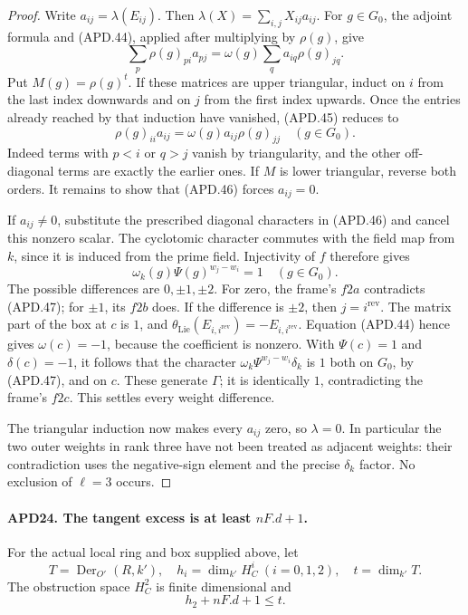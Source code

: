 \documentclass[11pt,a4paper]{article}
\numberwithin{equation}{section}
\theoremstyle{remark}\newtheorem{remark}[theorem]{Remark}
\begin{document}
\begin{proof}
Write \(a_{ij}=\lambda(E_{ij})\).  Then
\(\lambda(X)=\sum_{i,j}X_{ij}a_{ij}\).  For \(g\in G_0\),
the adjoint formula and (APD.44), applied after multiplying by
\(\rho(g)\), give
\[
 \sum_p\rho(g)_{pi}a_{pj}
                  =\omega(g)\sum_q a_{iq}\rho(g)_{jq}.
                                                               \tag{APD.45}
\]
Put \(M(g)=\rho(g)^t\).  If these matrices are upper
triangular, induct on \(i\) from the last index downwards
and on \(j\) from the first index upwards.  Once the entries
already reached by that induction have vanished, (APD.45)
reduces to
\[
       \rho(g)_{ii}a_{ij}
                         =\omega(g)a_{ij}\rho(g)_{jj}
                                  \quad(g\in G_0).       \tag{APD.46}
\]
Indeed terms with \(p<i\) or \(q>j\) vanish by triangularity,
and the other off-diagonal terms are exactly the earlier ones.
If \(M\) is lower triangular, reverse both orders.  It remains
to show that (APD.46) forces \(a_{ij}=0\).

If \(a_{ij}\ne0\), substitute the prescribed diagonal
characters in (APD.46) and cancel this nonzero scalar.  The
cyclotomic character commutes with the field map from \(k\),
since it is induced from the prime field.  Injectivity of \(f\)
therefore gives
\[
          \omega_k(g)\Psi(g)^{w_j-w_i}=1
                                  \quad(g\in G_0).       \tag{APD.47}
\]
The possible differences are \(0,\pm1,\pm2\).  For zero,
the frame's \(f2a\) contradicts (APD.47); for \(\pm1\),
its \(f2b\) does.  If the difference is \(\pm2\), then
\(j=i^{\mathrm{rev}}\).  The matrix part of the box at
\(c\) is \(1\), and
\(\theta_{\mathrm{Lie}}(E_{i,i^{\mathrm{rev}}})
             =-E_{i,i^{\mathrm{rev}}}\).
Equation (APD.44) hence gives \(\omega(c)=-1\), because
the coefficient is nonzero.  With \(\Psi(c)=1\) and
\(\delta(c)=-1\), it follows that the character
\(\omega_k\Psi^{w_j-w_i}\delta_k\) is \(1\) both on
\(G_0\), by (APD.47), and on \(c\).  These generate
\(\Gamma\); it is identically \(1\), contradicting the
frame's \(f2c\).  This settles every weight difference.

The triangular induction now makes every \(a_{ij}\) zero,
so \(\lambda=0\).  In particular the two outer weights in
rank three have not been treated as adjacent weights: their
contradiction uses the negative-sign element and the precise
\(\delta_k\) factor.  No exclusion of \(\ell=3\) occurs.
\end{proof}

\paragraph{APD24. The tangent excess is at least \(nF.d+1\).}
\label{claim:APD24}
For the actual local ring and box supplied above, let
\[
 T=\operatorname{Der}_{O'}(R,k'),\quad
 h_i=\dim_{k'}H_C^i\ (i=0,1,2),\quad t=\dim_{k'}T.
\]
The obstruction space \(H_C^2\) is finite dimensional and
\[
                         h_2+nF.d+1\le t.                \tag{APD.48}
\]
\end{document}
